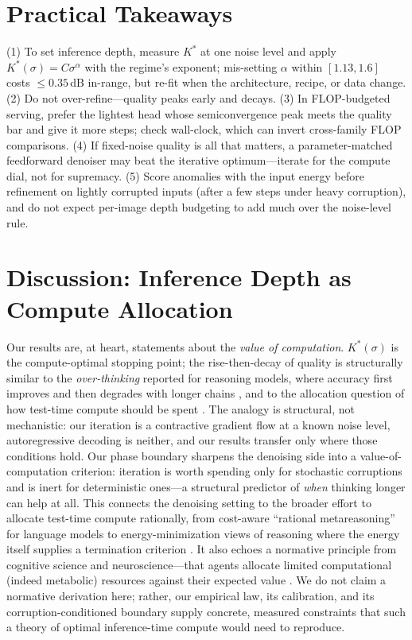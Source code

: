 \documentclass[letterpaper]{article}
\begin{document}
\section{Practical Takeaways}
(1) To set inference depth, measure $K^{*}$ at one noise level and apply
$K^{*}(\sigma)=C\sigma^{\alpha}$ with the regime's exponent; mis-setting $\alpha$ within $[1.13,1.6]$
costs $\leq0.35$\,dB in-range, but re-fit when the architecture, recipe, or data change. (2) Do not
over-refine---quality peaks early and decays. (3) In FLOP-budgeted serving, prefer the lightest head
whose semiconvergence peak meets the quality bar and give it more steps; check wall-clock, which can
invert cross-family FLOP comparisons. (4) If fixed-noise quality is all that matters, a parameter-matched
feedforward denoiser may beat the iterative optimum---iterate for the compute dial, not for supremacy.
(5) Score anomalies with the input energy before refinement on lightly corrupted inputs (after a few
steps under heavy corruption), and do not expect per-image depth budgeting to add much over the
noise-level rule.

\section{Discussion: Inference Depth as Compute Allocation}
Our results are, at heart, statements about the \emph{value of computation}. $K^{*}(\sigma)$ is the
compute-optimal stopping point; the rise-then-decay of quality is structurally similar to the
\emph{over-thinking} reported for reasoning models, where accuracy first improves and then degrades with
longer chains \citep{chen2024overthink}, and to the allocation question of how test-time compute should
be spent \citep{snell2024}. The analogy is structural, not mechanistic: our iteration is a contractive
gradient flow at a known noise level, autoregressive decoding is neither, and our results transfer only
where those conditions hold. Our phase boundary sharpens the denoising side into a
value-of-computation criterion: iteration is worth spending only for stochastic corruptions and is inert
for deterministic ones---a structural predictor of \emph{when} thinking longer can help at all. This
connects the denoising setting to the broader effort to allocate test-time compute rationally, from
cost-aware ``rational metareasoning'' for language models \citep{ram2024} to energy-minimization views of
reasoning where the energy itself supplies a termination criterion \citep{du2022}. It also echoes a
normative principle from cognitive science and neuroscience---that agents allocate limited computational
(indeed metabolic) resources against their expected value \citep{lieder2020,christie2015}. We do not claim
a normative derivation here; rather, our empirical law, its calibration, and its corruption-conditioned
boundary supply concrete, measured constraints that such a theory of optimal inference-time compute would
need to reproduce.
\end{document}
